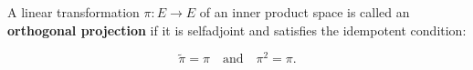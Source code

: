 A linear transformation $\pi: E \rightarrow E$ of an inner product space is called an \textbf{orthogonal projection} if it is selfadjoint and satisfies the idempotent condition:

$$\tilde{\pi} = \pi \quad \text{and} \quad \pi^2 = \pi.$$
